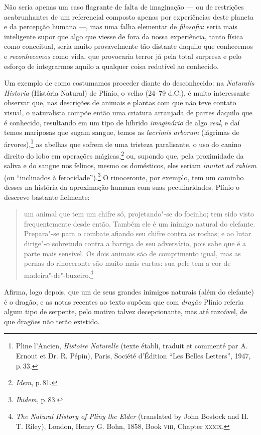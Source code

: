 Não seria apenas um caso flagrante de falta de imaginação --- ou de
restrições acabrunhantes de um referencial composto apenas por
experiências deste planeta e da percepção humana ---, mas uma falha
elementar de \emph{filosofia}: seria mais inteligente supor que algo que
viesse de fora da nossa experiência, tanto física como conceitual, seria
muito provavelmente tão distante daquilo que conhecemos e
\emph{reconhecemos} como vida, que provocaria terror já pela total
surpresa e pelo esforço de integrarmos aquilo a qualquer coisa redutível
ao conhecido.

Um exemplo de como costumamos proceder diante do desconhecido: na
\emph{Naturalis Historia} (História Natural) de Plínio, o velho (24--79
d.C.), é muito interessante observar que, nas descrições de animais e
plantas com que não teve contato visual, o naturalista compõe então uma
criatura arranjada de partes daquilo que é conhecido, resultando em um
tipo de híbrido \emph{imaginário} de algo \emph{real}, e daí temos
mariposas que sugam sangue, temos as \emph{lacrimis arborum} (lágrimas
de árvores),\footnote{Pline l'Ancien, \emph{Histoire Naturelle} (texte
  établi, traduit et commenté par A. Ernout et Dr. R. Pépin), Paris,
  Société d'Édition ``Les Belles Letters'', 1947, p.\,33.} as abelhas que
sofrem de uma tristeza paralisante, o uso do canino direito do lobo em
operações mágicas,\footnote{\emph{Idem}, p.\,81.} ou, supondo que, pela
proximidade da saliva e do sangue nos felinos, mesmo os domésticos, eles
seriam \emph{inuitat ad rabiem} (ou ``inclinados à
ferocidade'').\footnote{\emph{Ibidem}, p.\,83.} O rinoceronte, por
exemplo, tem um caminho desses na história da aproximação humana com
suas peculiaridades. Plínio o descreve bastante fielmente:

\begin{quote}
um animal que tem um chifre só, projetando"-se do focinho; tem sido visto
frequentemente desde então. Também ele é um inimigo natural do elefante.
Prepara"-se para o combate afiando seu chifre contra as rochas; e ao
lutar dirige"-o sobretudo contra a barriga de seu adversário, pois sabe
que é a parte mais sensível. Os dois animais são de comprimento igual,
mas as pernas do rinoceronte são muito mais curtas: sua pele tem a cor
de madeira"-de"-buxeiro.\footnote{\emph{The Natural History of Pliny the
  Elder} (translated by John Bostock and H. T. Riley), London, Henry G.
  Bohn, 1858, Book \textsc{viii}, Chapter \textsc{xxxix}.}
\end{quote}

Afirma, logo depois, que um de seus grandes inimigos naturais (além do
elefante) é o dragão, e as notas recentes ao texto supõem que com
\emph{dragão} Plínio referia algum tipo de serpente, pelo motivo talvez
decepcionante, mas até razoável, de que dragões não terão existido.

